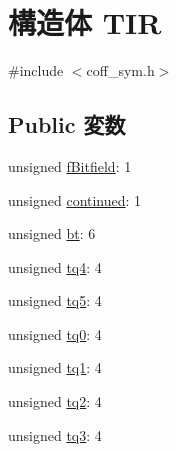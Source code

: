 \hypertarget{structTIR}{
\section{構造体 TIR}
\label{structTIR}
}


{\ttfamily \#include $<$coff\_\-sym.h$>$}\subsection*{Public 変数}
\begin{DoxyCompactItemize}
\item 
unsigned \hyperlink{structTIR_ad246d6944ff21fd623b2600a63e9c0f0}{fBitfield}: 1
\item 
unsigned \hyperlink{structTIR_a6a85a80877156713ad4f3c0a650f70fe}{continued}: 1
\item 
unsigned \hyperlink{structTIR_a1a88e6c7f1381b0f286d1fd9b4c0df6c}{bt}: 6
\item 
unsigned \hyperlink{structTIR_af0f5a4067c613c70800551d5a14d7e2d}{tq4}: 4
\item 
unsigned \hyperlink{structTIR_aee720ea4acfc7c04c5f43e5bba7371cf}{tq5}: 4
\item 
unsigned \hyperlink{structTIR_a9dffd81e132126d4c133db1166e8adba}{tq0}: 4
\item 
unsigned \hyperlink{structTIR_a1e0fc2bf7f1c036c4b6d021f848c8457}{tq1}: 4
\item 
unsigned \hyperlink{structTIR_a543df74ca8233fc70a50ad50b2fe567e}{tq2}: 4
\item 
unsigned \hyperlink{structTIR_a8dc4b33bfc40bb4093ae8b8de2cf59b0}{tq3}: 4
\end{DoxyCompactItemize}


